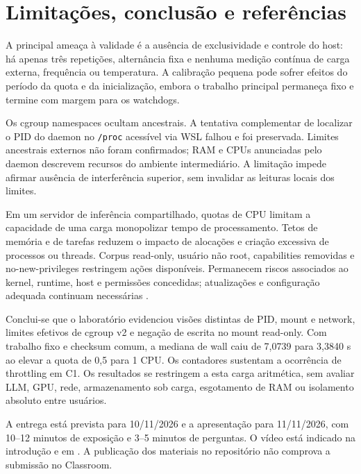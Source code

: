 \documentclass[12pt,a4paper]{article}
\newcommand{\secao}[1]{\clearpage\section{#1}}
\begin{document}
\secao{Limitações, conclusão e referências}
A principal ameaça à validade é a ausência de exclusividade e controle do host: há apenas três repetições, alternância fixa e nenhuma medição contínua de carga externa, frequência ou temperatura. A calibração pequena pode sofrer efeitos do período da quota e da inicialização, embora o trabalho principal permaneça fixo e termine com margem para os watchdogs.

Os cgroup namespaces ocultam ancestrais. A tentativa complementar de localizar o PID do daemon no \texttt{/proc} acessível via WSL falhou e foi preservada. Limites ancestrais externos não foram confirmados; RAM e CPUs anunciadas pelo daemon descrevem recursos do ambiente intermediário. A limitação impede afirmar ausência de interferência superior, sem invalidar as leituras locais dos limites.

Em um servidor de inferência compartilhado, quotas de CPU limitam a capacidade de uma carga monopolizar tempo de processamento. Tetos de memória e de tarefas reduzem o impacto de alocações e criação excessiva de processos ou threads. Corpus read-only, usuário não root, capabilities removidas e no-new-privileges restringem ações disponíveis. Permanecem riscos associados ao kernel, runtime, host e permissões concedidas; atualizações e configuração adequada continuam necessárias \cite{namespaces,cgroups,docker}.

Conclui-se que o laboratório evidenciou visões distintas de PID, mount e network, limites efetivos de cgroup v2 e negação de escrita no mount read-only. Com trabalho fixo e checksum comum, a mediana de wall caiu de 7,0739 para 3,3840 s ao elevar a quota de 0,5 para 1 CPU. Os contadores sustentam a ocorrência de throttling em C1. Os resultados se restringem a esta carga aritmética, sem avaliar LLM, GPU, rede, armazenamento sob carga, esgotamento de RAM ou isolamento absoluto entre usuários.

A entrega está prevista para 10/11/2026 e a apresentação para 11/11/2026, com 10--12 minutos de exposição e 3--5 minutos de perguntas. O vídeo está indicado na introdução e em . A publicação dos materiais no repositório não comprova a submissão no Classroom.
\end{document}
